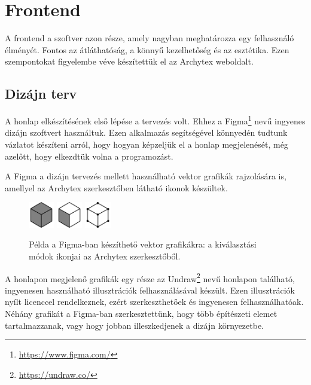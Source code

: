 \section{Frontend}

A frontend a szoftver azon része, amely nagyban meghatározza egy felhasználó élményét. Fontos az átláthatóság, a könnyű kezelhetőség és az esztétika. Ezen szempontokat figyelembe véve készítettük el az Archytex weboldalt.

\subsection{Dizájn terv}
A honlap elkészítésének első lépése a tervezés volt. Ehhez a Figma\footnote{\url{https://www.figma.com/}} nevű ingyenes dizájn szoftvert használtuk. Ezen alkalmazás segítségével könnyedén tudtunk vázlatot készíteni arról, hogy hogyan képzeljük el a honlap megjelenését, még azelőtt, hogy elkezdtük volna a programozást.

A Figma a dizájn tervezés mellett használható vektor grafikák rajzolására is, amellyel az Archytex szerkesztőben látható ikonok készültek.

\begin{figure}[h]
  \centering
  \includegraphics[width=0.1\textwidth]{parts/developer-documentation/frontend/images/meshSelectMode.png}
  \includegraphics[width=0.1\textwidth]{parts/developer-documentation/frontend/images/faceSelectMode.png}
  \includegraphics[width=0.1\textwidth]{parts/developer-documentation/frontend/images/vertexSelectMode.png}
  \caption{Példa a Figma-ban készíthető vektor grafikákra: a kiválasztási módok ikonjai az Archytex szerkesztőből.}
\end{figure}

A honlapon megjelenő grafikák egy része az Undraw\footnote{\url{https://undraw.co/}} nevű honlapon található, ingyenesen használható illusztrációk felhasználásával készült. Ezen illusztrációk nyílt licenccel rendelkeznek, ezért szerkeszthetőek és ingyenesen felhasználhatóak. Néhány grafikát a Figma-ban szerkesztettünk, hogy több építészeti elemet tartalmazzanak, vagy hogy jobban illeszkedjenek a dizájn környezetbe.

